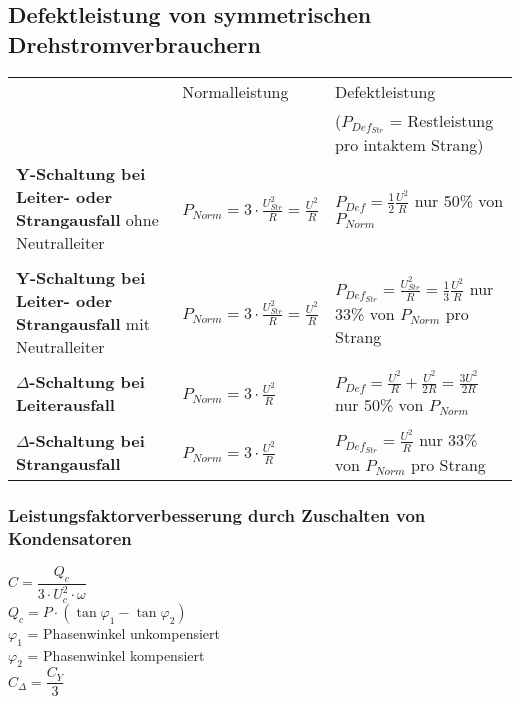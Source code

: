 	\subsection{Defektleistung von symmetrischen Drehstromverbrauchern}
		\begin{tabular}{| p{7.5cm} | l | l |}
			\hline
 				& Normalleistung		& Defektleistung \\
 				&&($P_{Def_{Str}}$ = Restleistung pro intaktem Strang) \\
 			\hline
	 			\textbf{Y-Schaltung bei Leiter- oder Strangausfall} ohne Neutralleiter &
	 				$P_{Norm} = 3 \cdot \frac{U^2_{Str}}{R} = \frac{U^2}{R}$ &
	 				$P_{Def} = \frac{1}{2} \frac{U^2}{R}$ \tiny{nur 50\% von $P_{Norm}$} \\
	 			&&\\
	 			\textbf{Y-Schaltung bei Leiter- oder Strangausfall} mit Neutralleiter &
	 				$P_{Norm} = 3 \cdot \frac{U^2_{Str}}{R} = \frac{U^2}{R}$ &
	 				$P_{Def_{Str}} = \frac{U^2_{Str}}{R} = \frac{1}{3} \frac{U^2}{R}$ \tiny{nur 33\% von
	 				$P_{Norm}$ pro Strang} \\ &&\\
	 			\textbf{$\Delta$-Schaltung bei Leiterausfall} &
	 				$P_{Norm} = 3 \cdot \frac{U^2}{R}$ &
	 				$P_{Def} = \frac{U^2}{R} + \frac{U^2}{2R} = \frac{3U^2}{2R}$ \tiny{nur 50\% von $P_{Norm}$} \\
	 			&&\\
	 			\textbf{$\Delta$-Schaltung bei Strangausfall} &
	 				$P_{Norm} = 3 \cdot \frac{U^2}{R}$ &
	 				$P_{Def_{Str}} = \frac{U^2}{R}$ \tiny{nur 33\% von $P_{Norm}$ pro Strang} \\
	 		\hline
		 \end{tabular} 
		 
		
		\subsubsection{Leistungsfaktorverbesserung durch Zuschalten von Kondensatoren}
				
					$C = \dfrac{Q_c}{3 \cdot U_c^2 \cdot \omega}$ \\
					$Q_c = P \cdot (\tan \varphi_1 - \tan \varphi_2) $ \\
					$\varphi_1$ = Phasenwinkel unkompensiert\\
					$\varphi_2$ = Phasenwinkel kompensiert \\
					$C_{\Delta} = \dfrac{C_Y}{3}$\\

